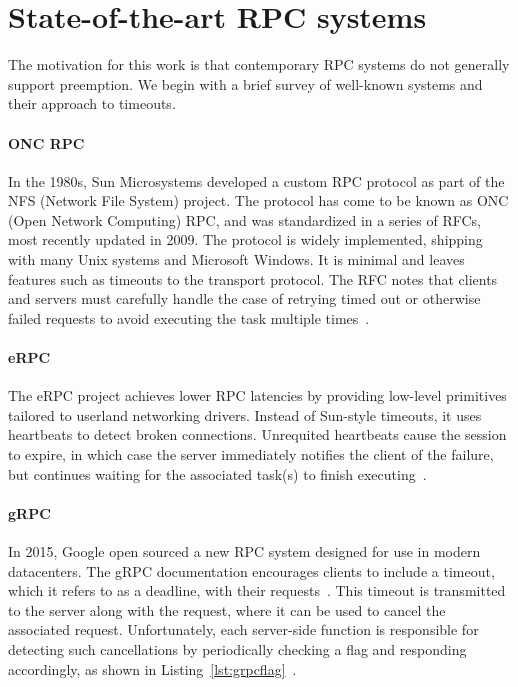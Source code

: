 \section{State-of-the-art RPC systems}

The motivation for this work is that contemporary RPC systems do not generally
support preemption.  We begin with a brief survey of well-known systems and their
approach to timeouts.

\paragraph{ONC RPC}
In the 1980s, Sun Microsystems developed a custom RPC protocol as part of the NFS
(Network File System) project.  The protocol has come to be known as ONC (Open
Network Computing) RPC, and was standardized in a series of RFCs, most recently
updated in 2009.  The protocol is widely implemented, shipping with many Unix systems
and Microsoft Windows.  It is minimal and leaves features such as timeouts to the
transport protocol.  The RFC notes that clients and servers must carefully handle the
case of retrying timed out or otherwise failed requests to avoid executing the task
multiple times~\cite{www-onc-rpc-rfc}.

\paragraph{eRPC}
The eRPC project achieves lower RPC latencies by providing low-level primitives
tailored to userland networking drivers.  Instead of Sun-style timeouts, it uses
heartbeats to detect broken connections.  Unrequited heartbeats cause the session to
expire, in which case the server immediately notifies the client of the
failure, but continues waiting for the associated task(s) to finish
executing~\cite{Kalia:nsdi2019}.

\paragraph{gRPC}
In 2015, Google open sourced a new RPC system designed for use in modern datacenters.
The gRPC documentation encourages clients to include a timeout, which it refers to as
a deadline, with their requests~\cite{www-grpc}.  This timeout is transmitted to the
server along with the request, where it can be used to cancel the associated request.
Unfortunately, each server-side function is responsible for detecting such
cancellations by periodically checking a flag and responding accordingly, as shown in
Listing~\ref{lst:grpcflag}~\cite{www-grpc-deadlines}.

